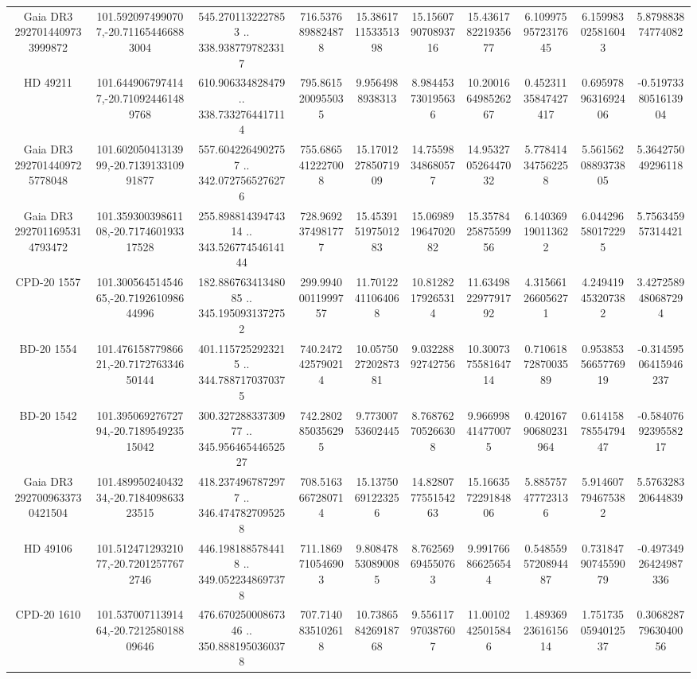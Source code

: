 \begin{table}
\begin{tabular}{cccccccccc}
Gaia DR3 2927014409733999872 & 101.5920974990707,-20.711654466883004 & 545.2701132227853 .. 338.9387797823317 & 716.5376898824878 & 15.386171153351398 & 15.156079070893716 & 15.436178221935677 & 6.1099759572317645 & 6.159983025816043 & 5.879883874774082 \\
HD  49211 & 101.6449067974147,-20.710924461489768 & 610.906334828479 .. 338.7332764417114 & 795.8615200955035 & 9.9564988938313 & 8.984453730195636 & 10.200166498526267 & 0.45231135847427417 & 0.6959789631692406 & -0.5197338051613904 \\
Gaia DR3 2927014409725778048 & 101.60205041313999,-20.713913310991877 & 557.6042264902757 .. 342.0727565276276 & 755.6865412227008 & 15.170122785071909 & 14.75598348680577 & 14.953270526447032 & 5.778414347562258 & 5.5615620889373805 & 5.364275049296118 \\
Gaia DR3 2927011695314793472 & 101.35930039861108,-20.717460193317528 & 255.89881439474314 .. 343.52677454614144 & 728.9692374981777 & 15.453915197501283 & 15.069891964702082 & 15.357842587559956 & 6.140369190113622 & 6.044296580172295 & 5.756345957314421 \\
CPD-20  1557 & 101.30056451454665,-20.719261098644996 & 182.88676341348085 .. 345.1950931372752 & 299.99400011999757 & 11.70122411064068 & 10.81282179265314 & 11.634982297791792 & 4.315661266056271 & 4.249419453207382 & 3.4272589480687294 \\
BD-20  1554 & 101.47615877986621,-20.717276334650144 & 401.1157252923215 .. 344.7887170370375 & 740.2472425790214 & 10.057502720287381 & 9.03228892742756 & 10.300737558164714 & 0.7106187287003589 & 0.9538535665776919 & -0.31459506415946237 \\
BD-20  1542 & 101.39506927672794,-20.718954923515042 & 300.32728833730977 .. 345.95646544652527 & 742.2802850356295 & 9.77300753602445 & 8.768762705266308 & 9.966998414770075 & 0.42016790680231964 & 0.6141587855479447 & -0.5840769239558217 \\
Gaia DR3 2927009633730421504 & 101.48995024043234,-20.718409863323515 & 418.2374967872977 .. 346.4747827095258 & 708.5163667280714 & 15.13750691223256 & 14.828077755154263 & 15.166357229184806 & 5.885757477723136 & 5.914607794675382 & 5.576328320644839 \\
HD  49106 & 101.51247129321077,-20.72012577672746 & 446.1981885784418 .. 349.0522348697378 & 711.1869710546903 & 9.808478530890085 & 8.762569694550763 & 9.991766866256544 & 0.5485595720894487 & 0.7318479074559079 & -0.49734926424987336 \\
CPD-20  1610 & 101.53700711391464,-20.721258018809646 & 476.67025000867346 .. 350.8881950360378 & 707.7140835102618 & 10.738658426918768 & 9.556117970387607 & 11.00102425015846 & 1.4893692361615614 & 1.7517350594012537 & 0.30682877963040056 \\

\end{tabular}
\end{table}
